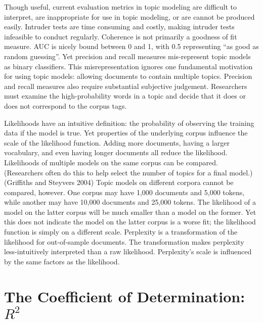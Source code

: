 \documentclass[conference,final,]{IEEEtran}
\begin{document}
Though useful, current evaluation metrics in topic modeling are
difficult to interpret, are inappropriate for use in topic modeling, or
are cannot be produced easily. Intruder tests are time consuming and
costly, making intruder tests infeasible to conduct regularly. Coherence
is not primarily a goodness of fit measure. AUC is nicely bound between
0 and 1, with 0.5 representing ``as good as random guessing''. Yet
precision and recall measures mis-represent topic models as binary
classifiers. This misrepresentation ignores one fundamental motivation
for using topic models: allowing documents to contain multiple topics.
Precision and recall measures also require substantial subjective
judgement. Researchers must examine the high-probability words in a
topic and decide that it does or does not correspond to the corpus tags.

Likelihoods have an intuitive definition: the probability of observing
the training data if the model is true. Yet properties of the underlying
corpus influence the scale of the likelihood function. Adding more
documents, having a larger vocabulary, and even having longer documents
all reduce the likelihood. Likelihoods of multiple models on the same
corpus can be compared. (Researchers often do this to help select the
number of topics for a final model.)(Griffiths and Steyvers 2004) Topic
models on different corpora cannot be compared, however. One corpus may
have 1,000 documents and 5,000 tokens, while another may have 10,000
documents and 25,000 tokens. The likelihood of a model on the latter
corpus will be much smaller than a model on the former. Yet this does
not indicate the model on the latter corpus is a worse fit; the
likelihood function is simply on a different scale. Perplexity is a
transformation of the likelihood for out-of-sample documents. The
transformation makes perplexity less-intuitively interpreted than a raw
likelihood. Perplexity's scale is influenced by the same factors as the
likelihood.

\hypertarget{the-coefficient-of-determination-r2}{%
\section{\texorpdfstring{The Coefficient of Determination:
\(R^2\)}{The Coefficient of Determination: R\^{}2}}\label{the-coefficient-of-determination-r2}}
\end{document}
